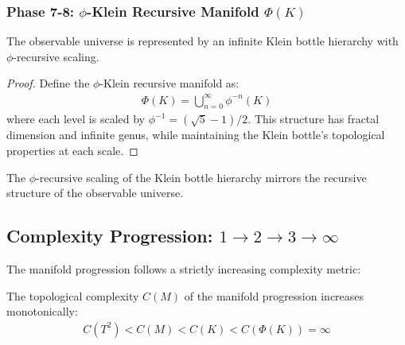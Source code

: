 \subsubsection{Phase 7-8: $\phi$-Klein Recursive Manifold $\Phi(K)$}

\begin{theorem}
The observable universe is represented by an infinite Klein bottle hierarchy with $\phi$-recursive scaling.
\end{theorem}

\begin{proof}
Define the $\phi$-Klein recursive manifold as:
\begin{align}
\Phi(K) = \bigcup_{n=0}^{\infty} \phi^{-n}(K)
\end{align}
where each level is scaled by $\phi^{-1} = (\sqrt{5}-1)/2$. This structure has fractal dimension and infinite genus, while maintaining the Klein bottle's topological properties at each scale.
\end{proof}

\begin{lemma}
The $\phi$-recursive scaling of the Klein bottle hierarchy mirrors the recursive structure of the observable universe.
\end{lemma}

\subsection{Complexity Progression: $1 \rightarrow 2 \rightarrow 3 \rightarrow \infty$}

The manifold progression follows a strictly increasing complexity metric:

\begin{theorem}
The topological complexity $C(M)$ of the manifold progression increases monotonically:
\begin{align}
C(T^2) < C(M) < C(K) < C(\Phi(K)) = \infty
\end{align}
\end{theorem}

